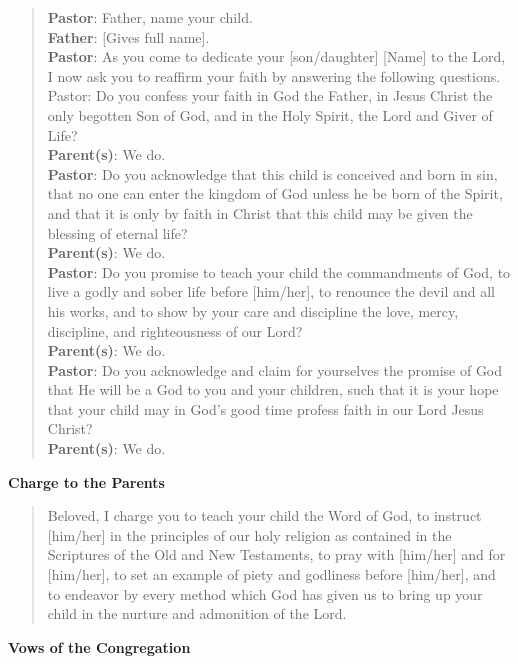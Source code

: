 \documentclass[
]{book}
\begin{document}
\begin{quote}
\textbf{Pastor}: Father, name your child.\\
\textbf{Father}: {[}Gives full name{]}.\\
\textbf{Pastor}: As you come to dedicate your {[}son/daughter{]} {[}Name{]} to the Lord, I now ask you to reaffirm your faith by answering the following questions.\\
Pastor: Do you confess your faith in God the Father, in Jesus Christ the only begotten Son of God, and in the Holy Spirit, the Lord and Giver of Life?\\
\textbf{Parent(s)}: We do.\\
\textbf{Pastor}: Do you acknowledge that this child is conceived and born in sin, that no one can enter the kingdom of God unless he be born of the Spirit, and that it is only by faith in Christ that this child may be given the blessing of eternal life?\\
\textbf{Parent(s)}: We do.\\
\textbf{Pastor}: Do you promise to teach your child the commandments of God, to live a godly and sober life before {[}him/her{]}, to renounce the devil and all his works, and to show by your care and discipline the love, mercy, discipline, and righteousness of our Lord?\\
\textbf{Parent(s)}: We do.\\
\textbf{Pastor}: Do you acknowledge and claim for yourselves the promise of God that He will be a God to you and your children, such that it is your hope that your child may in God's good time profess faith in our Lord Jesus Christ?\\
\textbf{Parent(s)}: We do.
\end{quote}

\textbf{Charge to the Parents}

\begin{quote}
Beloved, I charge you to teach your child the Word of God, to instruct {[}him/her{]} in the principles of our holy religion as contained in the Scriptures of the Old and New Testaments, to pray with {[}him/her{]} and for {[}him/her{]}, to set an example of piety and godliness before {[}him/her{]}, and to endeavor by every method which God has given us to bring up your child in the nurture and admonition of the Lord.
\end{quote}

\textbf{Vows of the Congregation}
\end{document}
